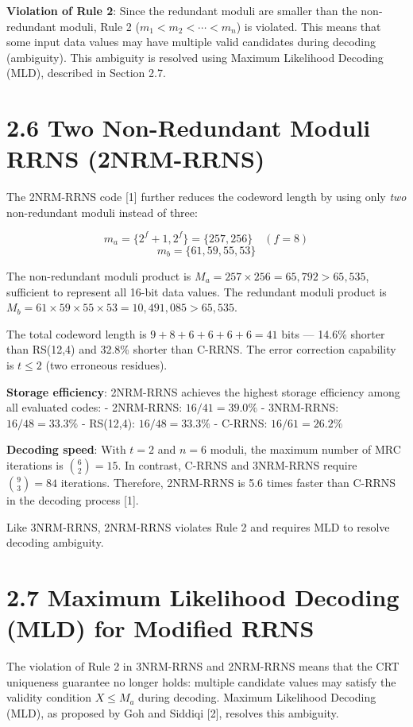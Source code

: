 \documentclass[
  12pt,
  a4paper]{report}
\begin{document}
\textbf{Violation of Rule 2}: Since the redundant moduli are smaller
than the non-redundant moduli, Rule 2 (\(m_1 < m_2 < \cdots < m_n\)) is
violated. This means that some input data values may have multiple valid
candidates during decoding (ambiguity). This ambiguity is resolved using
Maximum Likelihood Decoding (MLD), described in Section 2.7.

\section{2.6 Two Non-Redundant Moduli RRNS
(2NRM-RRNS)}\label{two-non-redundant-moduli-rrns-2nrm-rrns}

The 2NRM-RRNS code {[}1{]} further reduces the codeword length by using
only \emph{two} non-redundant moduli instead of three:

\[m_a = \{2^f + 1, 2^f\} = \{257, 256\} \quad (f = 8)\]
\[m_b = \{61, 59, 55, 53\}\]

The non-redundant moduli product is
\(M_a = 257 \times 256 = 65{,}792 > 65{,}535\), sufficient to represent
all 16-bit data values. The redundant moduli product is
\(M_b = 61 \times 59 \times 55 \times 53 = 10{,}491{,}085 > 65{,}535\).

The total codeword length is \(9 + 8 + 6 + 6 + 6 + 6 = 41\) bits ---
14.6\% shorter than RS(12,4) and 32.8\% shorter than C-RRNS. The error
correction capability is \(t \leq 2\) (two erroneous residues).

\textbf{Storage efficiency}: 2NRM-RRNS achieves the highest storage
efficiency among all evaluated codes: - 2NRM-RRNS: \(16/41 = 39.0\%\) -
3NRM-RRNS: \(16/48 = 33.3\%\) - RS(12,4): \(16/48 = 33.3\%\) - C-RRNS:
\(16/61 = 26.2\%\)

\textbf{Decoding speed}: With \(t = 2\) and \(n = 6\) moduli, the
maximum number of MRC iterations is \(\binom{6}{2} = 15\). In contrast,
C-RRNS and 3NRM-RRNS require \(\binom{9}{3} = 84\) iterations.
Therefore, 2NRM-RRNS is 5.6 times faster than C-RRNS in the decoding
process {[}1{]}.

Like 3NRM-RRNS, 2NRM-RRNS violates Rule 2 and requires MLD to resolve
decoding ambiguity.

\section{2.7 Maximum Likelihood Decoding (MLD) for Modified
RRNS}\label{maximum-likelihood-decoding-mld-for-modified-rrns}

The violation of Rule 2 in 3NRM-RRNS and 2NRM-RRNS means that the CRT
uniqueness guarantee no longer holds: multiple candidate values may
satisfy the validity condition \(X \leq M_a\) during decoding. Maximum
Likelihood Decoding (MLD), as proposed by Goh and Siddiqi {[}2{]},
resolves this ambiguity.
\end{document}
